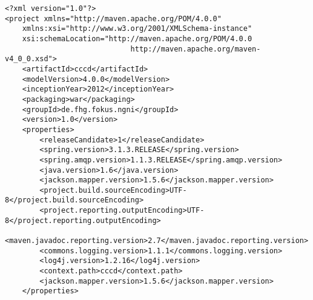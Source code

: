 
\begin{appendix}

\begin{code}
\begin{verbatim}
<?xml version="1.0"?>
<project xmlns="http://maven.apache.org/POM/4.0.0" 
	xmlns:xsi="http://www.w3.org/2001/XMLSchema-instance"
	xsi:schemaLocation="http://maven.apache.org/POM/4.0.0
							 http://maven.apache.org/maven-v4_0_0.xsd">
	<artifactId>cccd</artifactId>
	<modelVersion>4.0.0</modelVersion>
	<inceptionYear>2012</inceptionYear>
	<packaging>war</packaging>
	<groupId>de.fhg.fokus.ngni</groupId>
	<version>1.0</version>
	<properties>
		<releaseCandidate>1</releaseCandidate>
		<spring.version>3.1.3.RELEASE</spring.version>
		<spring.amqp.version>1.1.3.RELEASE</spring.amqp.version>
		<java.version>1.6</java.version>
		<jackson.mapper.version>1.5.6</jackson.mapper.version>
		<project.build.sourceEncoding>UTF-8</project.build.sourceEncoding>
		<project.reporting.outputEncoding>UTF-8</project.reporting.outputEncoding>
		<maven.javadoc.reporting.version>2.7</maven.javadoc.reporting.version>
		<commons.logging.version>1.1.1</commons.logging.version>
		<log4j.version>1.2.16</log4j.version>
		<context.path>cccd</context.path>
		<jackson.mapper.version>1.5.6</jackson.mapper.version>
	</properties>


\end{verbatim}
\end{code}
\end{appendix}
